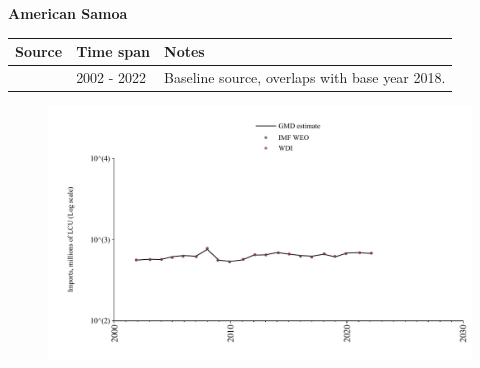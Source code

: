 \documentclass[12pt,a4paper,landscape]{article}
\begin{document}
\begin{adjustbox}{max totalsize={\paperwidth}{\paperheight},center}
\begin{minipage}[t][\textheight][t]{\textwidth}
\vspace*{0.5cm}
{}
\begin{center}
{\Large\bfseries American Samoa}
\end{center}
\vspace{0.5cm}
\begin{table}[H]
\centering
\small
\begin{tabular}{|l|l|l|}
\hline
\textbf{Source} & \textbf{Time span} & \textbf{Notes} \\
\hline
\rowcolor{white}\cite{WDI}& 2002 - 2022 &Baseline source, overlaps with base year 2018.\\
\hline
\end{tabular}
\end{table}
\begin{figure}[H]
\centering
\includegraphics[width=\textwidth,height=0.6\textheight,keepaspectratio]{graphs/ASM_imports.pdf}
\end{figure}
\end{minipage}
\end{adjustbox}
\end{document}
